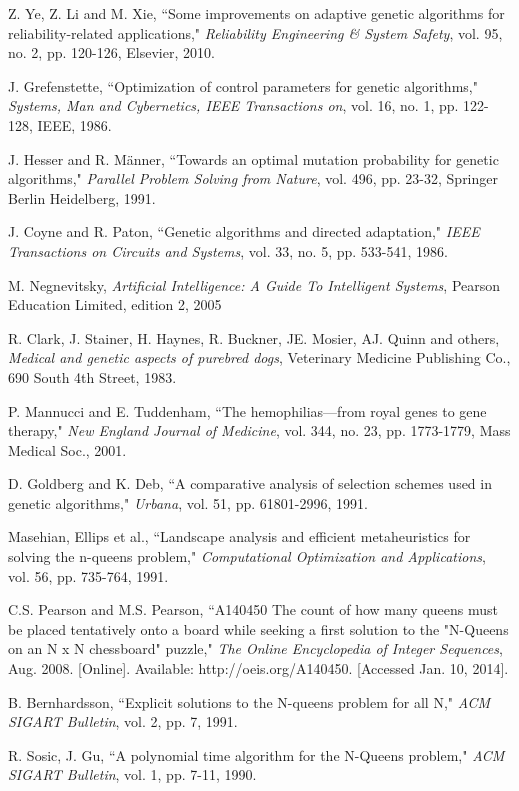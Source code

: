 \documentclass[conference]{IEEEtran}
\begin{document}
\begin{thebibliography}{23}
 Z. Ye, Z. Li and M. Xie, ``Some improvements on adaptive genetic algorithms for reliability-related applications,"
        {\it Reliability Engineering \& System Safety}, vol. 95, no. 2, pp. 120-126, Elsevier, 2010.

 J. Grefenstette, ``Optimization of control parameters for genetic algorithms,"
        {\it Systems, Man and Cybernetics, IEEE Transactions on}, vol. 16, no. 1, pp. 122-128, IEEE, 1986.

 J. Hesser and R. M{\"a}nner, ``Towards an optimal mutation probability for genetic algorithms,"
        {\it Parallel Problem Solving from Nature}, vol. 496, pp. 23-32, Springer Berlin Heidelberg, 1991.

 J. Coyne and R. Paton, ``Genetic algorithms and directed adaptation,"
        {\it IEEE Transactions on Circuits and Systems}, vol. 33, no. 5, pp. 533-541, 1986.

 M. Negnevitsky,
        {\it Artificial Intelligence: A Guide To Intelligent Systems}, Pearson Education Limited, edition 2, 2005


 R. Clark, J. Stainer, H. Haynes, R. Buckner, JE. Mosier, AJ. Quinn and others,
        {\it Medical and genetic aspects of purebred dogs}, Veterinary Medicine Publishing Co., 690 South 4th Street, 1983.


 P. Mannucci and E. Tuddenham, ``The hemophilias—from royal genes to gene therapy,"
        {\it New England Journal of Medicine}, vol. 344, no. 23, pp. 1773-1779, Mass Medical Soc., 2001.

 D. Goldberg and K. Deb, ``A comparative analysis of selection schemes used in genetic algorithms,"
        {\it Urbana}, vol. 51, pp. 61801-2996, 1991.

 Masehian, Ellips et al., ``Landscape analysis and efficient metaheuristics for solving the n-queens problem,"
        {\it Computational Optimization and Applications}, vol. 56, pp. 735-764, 1991.


 C.S. Pearson and M.S. Pearson, ``A140450 The count of how many queens must be placed tentatively onto a board while seeking a first solution to the "N-Queens on an N x N chessboard" puzzle,"
        {\it The Online Encyclopedia of Integer Sequences}, Aug. 2008. [Online]. Available: http://oeis.org/A140450. [Accessed Jan. 10, 2014].
        
 B. Bernhardsson, ``Explicit solutions to the N-queens problem for all N,"
        {\it ACM SIGART Bulletin}, vol. 2, pp. 7, 1991.

 R. Sosic, J. Gu, ``A polynomial time algorithm for the N-Queens problem,"
        {\it ACM SIGART Bulletin}, vol. 1, pp. 7-11, 1990.
        

\end{thebibliography}

\end{document}
